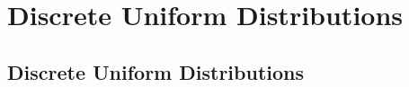 \documentclass[../alevelmaths.tex]{subfiles}
\begin{document}
\chapter{Discrete Uniform Distributions}
\section{Discrete Uniform Distributions}
\end{document}
